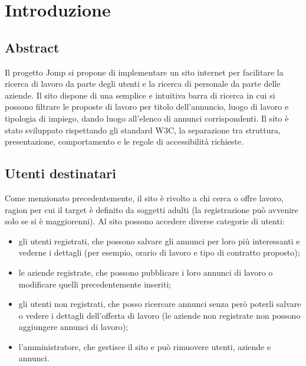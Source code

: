 \section{Introduzione}
	\subsection{Abstract}
	Il progetto Jomp si propone di implementare un sito internet per facilitare la ricerca di lavoro da parte degli utenti e la ricerca di personale da parte delle aziende. Il sito dispone di una semplice e intuitiva barra di ricerca in cui si possono filtrare le proposte di lavoro per titolo dell'annuncio, luogo di lavoro e tipologia di impiego, dando luogo all'elenco di annunci corrispondenti.
	Il sito è stato sviluppato rispettando gli standard W3C, la separazione tra struttura, presentazione, comportamento e le regole di accessibilità richieste. 
	\subsection{Utenti destinatari}
	Come menzionato precedentemente, il sito è rivolto a chi cerca o offre lavoro, ragion per cui il target è definito da soggetti adulti (la registrazione può avvenire solo se si è maggiorenni).
Al sito possono accedere diverse categorie di utenti: 
\begin{itemize}
\item gli utenti registrati, che possono salvare gli annunci per loro più interessanti e vederne i dettagli (per esempio, orario di lavoro e tipo di contratto proposto); 
\item le aziende registrate, che possono pubblicare i loro annunci di lavoro o modificare quelli precedentemente inseriti;
\item gli utenti non registrati, che posso ricercare annunci senza però poterli salvare o vedere i dettagli dell'offerta di lavoro (le aziende non registrate non possono aggiungere annunci di lavoro); 
\item l'amministratore, che gestisce il sito e può rimuovere utenti, aziende e annunci.
\end{itemize}
